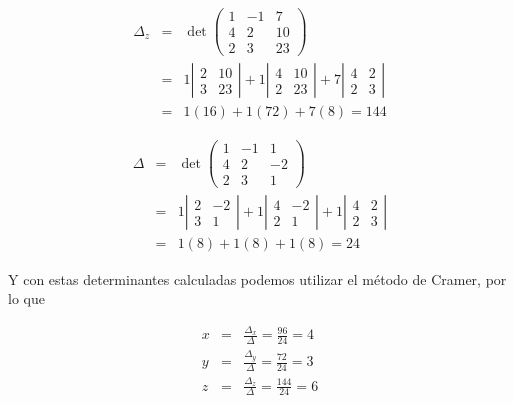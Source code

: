 \documentclass[12pt]{article}
\begin{document}
\begin{multicols}{2}
\begin{enumerate}[A.]
		\begin{eqnarray*}
			\Delta_z &=& \det\left(\begin{array}{rrr}
						1 & -1 & 7 \\
						4 & 2 & 10 \\
						2 & 3 & 23
						\end{array}\right)  \\
				&=& 1 \left|\begin{array}{rr}
						2 & 10 \\
						3 & 23
					\end{array}\right| 
					+1 \left|\begin{array}{rr}
						4 & 10 \\
						2 & 23
					\end{array}\right| 
					+7 \left|\begin{array}{rr}
						4 & 2 \\
						2 & 3
					\end{array}\right| \\
				&=&  1(16) +1(72) +7(8) = 144
		\end{eqnarray*}
		
		\begin{eqnarray*}
			\Delta &=& \det\left(\begin{array}{rrr}
						1 & -1 & 1 \\
						4 & 2 & -2 \\
						2 & 3 & 1
						\end{array}\right) \\
				&=& 1 \left|\begin{array}{rr}
						2 & -2 \\
						3 & 1
					\end{array}\right|
					+1 \left|\begin{array}{rr}
						4 & -2 \\
						2 & 1
					\end{array}\right| 
					+1 \left|\begin{array}{rr}
						4 & 2 \\
						2 & 3
					\end{array}\right|  \\
				&=&  1(8) +1(8) +1(8) = 24
		\end{eqnarray*}
		
		Y con estas determinantes calculadas podemos utilizar el m\'etodo de Cramer, por lo que
		
		\begin{eqnarray*}
			x &=& \frac{\Delta_x}{\Delta} = \frac{96}{24} = 4 \\
			y &=& \frac{\Delta_y}{\Delta} = \frac{72}{24} = 3 \\
			z &=& \frac{\Delta_z}{\Delta} = \frac{144}{24} = 6
		\end{eqnarray*}
		

\end{enumerate}
\end{multicols}
\end{document}
